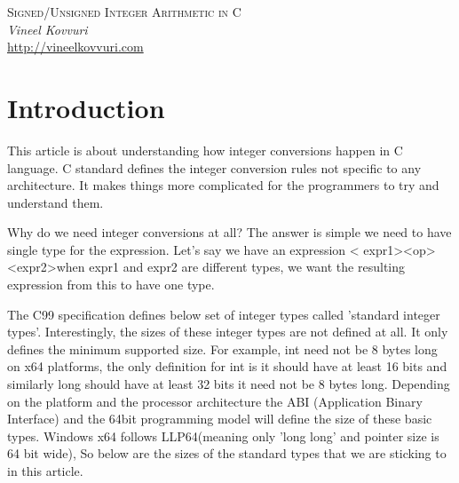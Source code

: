 \documentclass{article}
\begin{document}
\begin{titlepage}
   \begin{center}
      \Large\textsc{Signed/Unsigned Integer Arithmetic in C}\\
      \vspace{5mm}
      \Large\textit{Vineel Kovvuri}\\
      \url{http://vineelkovvuri.com}\\
   \end{center}
\end{titlepage}

\tableofcontents

\newpage
\section{Introduction}
This article is about understanding how integer conversions happen in C
language. C standard defines the integer conversion rules not specific to any
architecture. It makes things more complicated for the programmers to try and
understand them.

Why do we need integer conversions at all? The answer is simple we need to have
single type for the expression. Let's say we have an expression \textless
expr1\textgreater \textless op\textgreater \textless expr2\textgreater  when
expr1 and expr2 are different types, we want the resulting expression from this
to have one type.

The C99 specification defines below set of integer types called 'standard integer
types'. Interestingly, the sizes of these integer types are not defined at all.
It only defines the minimum supported size. For example, int need not be 8 bytes
long on x64 platforms, the only definition for int is it should have at least 16
bits and similarly long should have at least 32 bits it need not be 8 bytes
long. Depending on the platform and the processor architecture the ABI
(Application Binary Interface) and the 64bit programming model will define the
size of these basic types. Windows x64 follows LLP64(meaning only 'long long'
and pointer size is 64 bit wide), So below are the sizes of the standard types
that we are sticking to in this article.
\end{document}

